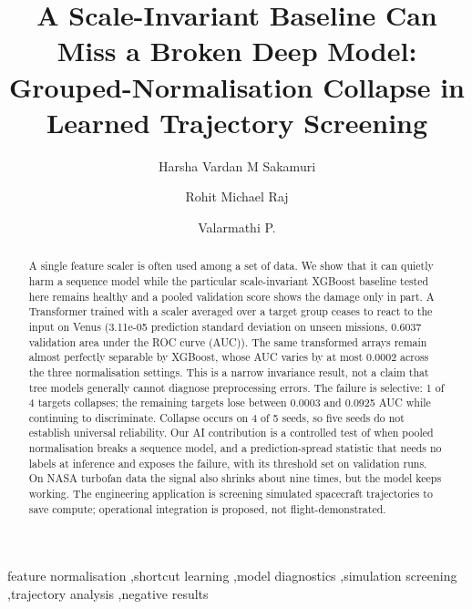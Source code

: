 \documentclass[preprint,12pt,authoryear]{elsarticle}
\begin{document}
\begin{frontmatter}

\title{A Scale-Invariant Baseline Can Miss a Broken Deep Model: Grouped-Normalisation Collapse in Learned Trajectory Screening}

\author[inst1]{Harsha Vardan M Sakamuri}
\author[inst1]{Rohit Michael Raj}
\author[inst1]{Valarmathi P.}

\begin{abstract}
A single feature scaler is often used among a set of data. We show that it can quietly harm a sequence model while the particular scale-invariant XGBoost baseline tested here remains healthy and a pooled validation score shows the damage only in part. A Transformer trained with a scaler averaged over a target group ceases to react to the input on Venus (3.11e-05 prediction standard deviation on unseen missions, 0.6037 validation area under the ROC curve (AUC)). The same transformed arrays remain almost perfectly separable by XGBoost, whose AUC varies by at most 0.0002 across the three normalisation settings. This is a narrow invariance result, not a claim that tree models generally cannot diagnose preprocessing errors. The failure is selective: 1 of 4 targets collapses; the remaining targets lose between 0.0003 and 0.0925 AUC while continuing to discriminate. Collapse occurs on 4 of 5 seeds, so five seeds do not establish universal reliability. Our AI contribution is a controlled test of when pooled normalisation breaks a sequence model, and a prediction-spread statistic that needs no labels at inference and exposes the failure, with its threshold set on validation runs. On NASA turbofan data the signal also shrinks about nine times, but the model keeps working. The engineering application is screening simulated spacecraft trajectories to save compute; operational integration is proposed, not flight-demonstrated.
\end{abstract}


\begin{keyword}
feature normalisation \sep shortcut learning \sep model diagnostics \sep simulation screening \sep trajectory analysis \sep negative results
\end{keyword}

\end{frontmatter}
\end{document}
